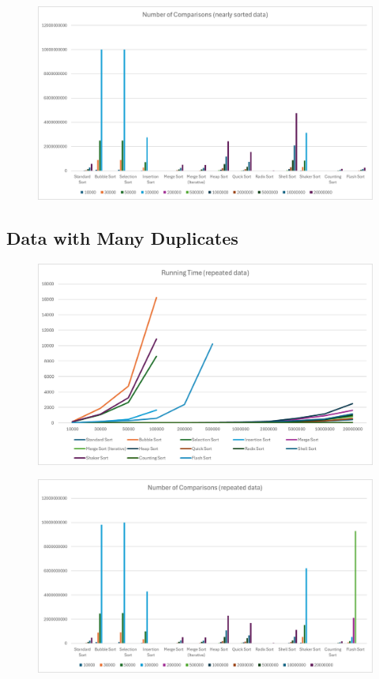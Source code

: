 \documentclass{article}
\begin{document}
\begin{figure}[ht]
	\centering
	\includegraphics[width=14cm]{images/comp_nearly.png}
\end{figure}


\pagebreak


\subsection{Data with Many Duplicates}

\begin{figure}[ht]
	\centering
	\includegraphics[width=14cm]{images/time_repeated.png}
\end{figure}

\begin{figure}[ht]
	\centering
	\includegraphics[width=14cm]{images/comp_repeated.png}
\end{figure}
\end{document}
